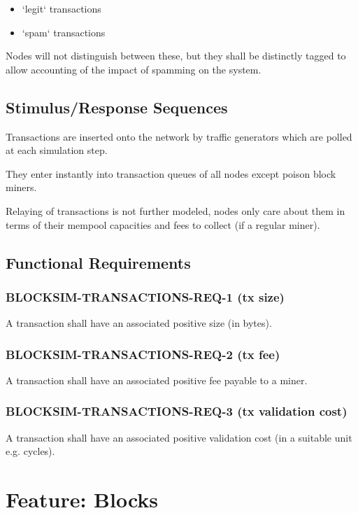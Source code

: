 \documentclass{scrreprt}
\begin{document}
\begin{itemize}
   \item `legit` transactions
   \item `spam` transactions
\end{itemize}

Nodes will not distinguish between these, but they shall be distinctly
tagged to allow accounting of the impact of spamming on the system.


\subsection{Stimulus/Response Sequences}

Transactions are inserted onto the network by traffic generators which are
polled at each simulation step.

They enter instantly into transaction queues of all nodes except poison block
miners.

Relaying of transactions is not further modeled, nodes only care about
them in terms of their mempool capacities and fees to collect
(if a regular miner).


\subsection{Functional Requirements}

\subsubsection{BLOCKSIM-TRANSACTIONS-REQ-1 (tx size)}

A transaction shall have an associated positive size (in bytes).

\subsubsection{BLOCKSIM-TRANSACTIONS-REQ-2 (tx fee)}

A transaction shall have an associated positive fee payable to a miner.

\subsubsection{BLOCKSIM-TRANSACTIONS-REQ-3 (tx validation cost)}

A transaction shall have an associated positive validation cost (in a suitable unit e.g. cycles).



\section{Feature: Blocks}
\end{document}
